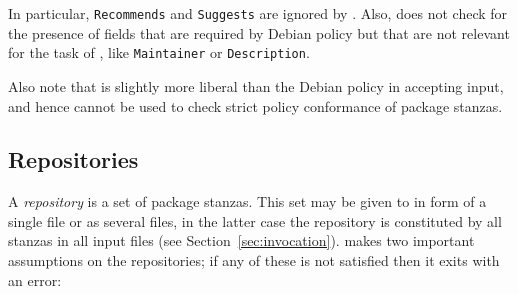 In particular, \texttt{Recommends} and \texttt{Suggests} are ignored
by \debcheck. Also, \debcheck{} does not check for the presence of
fields that are required by Debian policy but that are not relevant
for the task of \debcheck, like \texttt{Maintainer} or
\texttt{Description}.

Also note that \debcheck{} is slightly more liberal than the Debian
policy in accepting input, and hence cannot be used to check strict
policy conformance of package stanzas.

\subsection{Repositories}
\label{sec:repositories}
A \emph{repository} is a set of package stanzas. This set may be given
to \debcheck{} in form of a single file or as several files, in the
latter case the repository is constituted by all stanzas in all input
files (see Section~\ref{sec:invocation}). \debcheck{} makes two
important assumptions on the repositories; if any of these is not
satisfied then it exits with an error:

